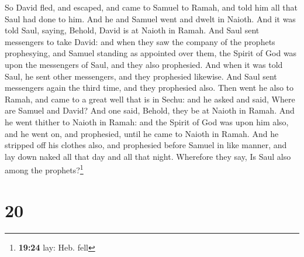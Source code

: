  So David fled, and escaped, and came to Samuel to Ramah,
and told him all that Saul had done to him. And he and Samuel went and
dwelt in Naioth.  And it was told Saul, saying, Behold,
David is at Naioth in Ramah.  And Saul sent messengers to
take David: and when they saw the company of the prophets prophesying,
and Samuel standing as appointed over them, the Spirit of God was upon
the messengers of Saul, and they also prophesied.  And
when it was told Saul, he sent other messengers, and they prophesied
likewise. And Saul sent messengers again the third time, and they
prophesied also.  Then went he also to Ramah, and came to
a great well that is in Sechu: and he asked and said, Where are Samuel
and David? And one said, Behold, they be at Naioth in Ramah.
 And he went thither to Naioth in Ramah: and the Spirit
of God was upon him also, and he went on, and prophesied, until he came
to Naioth in Ramah.  And he stripped off his clothes
also, and prophesied before Samuel in like manner, and lay down naked
all that day and all that night. Wherefore they say, Is Saul also among
the prophets?\footnote{\textbf{19:24} lay: Heb. fell}

\hypertarget{section-19}{%
\section{20}\label{section-19}}

